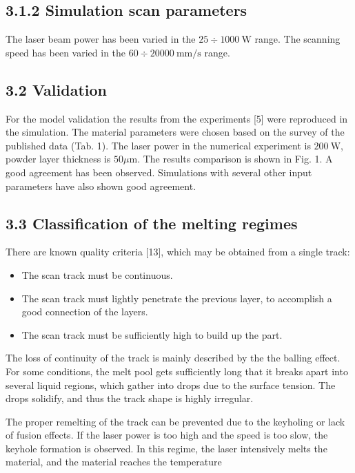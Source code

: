 \documentclass[10pt]{article}
\begin{document}
\subsection*{3.1.2 Simulation scan parameters}
The laser beam power has been varied in the $25 \div 1000 \mathrm{~W}$ range. The scanning speed has been varied in the $60 \div 20000 \mathrm{~mm} / \mathrm{s}$ range.

\subsection*{3.2 Validation}
For the model validation the results from the experiments [5] were reproduced in the simulation. The material parameters were chosen based on the survey of the published data (Tab. 1). The laser power in the numerical experiment is $200 \mathrm{~W}$, powder layer thickness is $50 \mu \mathrm{m}$. The results comparison is shown in Fig. 1. A good agreement has been observed. Simulations with several other input parameters have also shown good agreement.

\subsection*{3.3 Classification of the melting regimes}
There are known quality criteria [13], which may be obtained from a single track:

\begin{itemize}
  \item The scan track must be continuous.
  \item The scan track must lightly penetrate the previous layer, to accomplish a good connection of the layers.
  \item The scan track must be sufficiently high to build up the part.
\end{itemize}

The loss of continuity of the track is mainly described by the the balling effect. For some conditions, the melt pool gets sufficiently long that it breaks apart into several liquid regions, which gather into drops due to the surface tension. The drops solidify, and thus the track shape is highly irregular.

The proper remelting of the track can be prevented due to the keyholing or lack of fusion effects. If the laser power is too high and the speed is too slow, the keyhole formation is observed. In this regime, the laser intensively melts the material, and the material reaches the temperature
\end{document}
